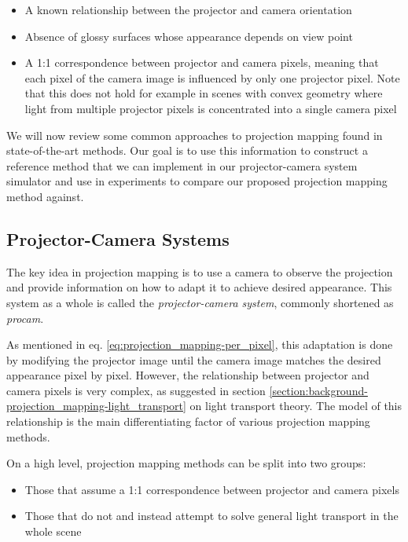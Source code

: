\begin{itemize}
    \item A known relationship between the projector and camera orientation
    \item Absence of glossy surfaces whose appearance depends on view point
    \item A 1:1 correspondence between projector and camera pixels, meaning that each pixel of the camera image is influenced by only one projector pixel. Note that this does not hold for example in scenes with convex geometry where light from multiple projector pixels is concentrated into a single camera pixel
\end{itemize}

We will now review some common approaches to projection mapping found in state-of-the-art methods. Our goal is to use this information to construct a reference method that we can implement in our projector-camera system simulator and use in experiments to compare our proposed projection mapping method against.

\subsection{Projector-Camera Systems}
\label{section:background-projection_mapping-procams}

The key idea in projection mapping is to use a camera to observe the projection and provide information on how to adapt it to achieve desired appearance. This system as a whole is called the \textit{projector-camera system}, commonly shortened as \textit{procam}.

As mentioned in eq. \ref{eq:projection_mapping-per_pixel}, this adaptation is done by modifying the projector image until the camera image matches the desired appearance pixel by pixel. However, the relationship between projector and camera pixels is very complex, as suggested in section \ref{section:background-projection_mapping-light_transport} on light transport theory. The model of this relationship is the main differentiating factor of various projection mapping methods.

On a high level, projection mapping methods can be split into two groups:

\begin{itemize}
    \item Those that assume a 1:1 correspondence between projector and camera pixels
    \item Those that do not and instead attempt to solve general light transport in the whole scene
\end{itemize}

